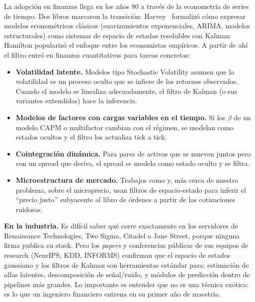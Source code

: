 \documentclass[journal,onecolumn,11pt]{IEEEtran}
\begin{document}
\medskip

\noindent
La adopción en finanzas llega en los años 80 a través de la
econometría de series de tiempo. Dos libros marcaron la transición:
Harvey~\cite{harvey1989} formalizó cómo expresar modelos econométricos
clásicos (suavizamientos exponenciales, ARIMA, modelos estructurales)
como sistemas de espacio de estados resolubles con Kalman; Hamilton
\cite{hamilton1994} popularizó el enfoque entre los economistas
empíricos. A partir de ahí el filtro entró en finanzas cuantitativas
para tareas concretas:
\begin{itemize}
\item \textbf{Volatilidad latente.} Modelos tipo Stochastic Volatility
      asumen que la volatilidad es un proceso oculto que se infiere
      de los retornos observados. Cuando el modelo se linealiza
      adecuadamente, el filtro de Kalman (o sus variantes extendidas)
      hace la inferencia.
\item \textbf{Modelos de factores con cargas variables en el tiempo.}
      Si los $\beta$ de un modelo CAPM o multifactor cambian con el
      régimen, se modelan como estados ocultos y el filtro los
      actualiza tick a tick.
\item \textbf{Cointegración dinámica.} Para pares de activos que se
      mueven juntos pero con un spread que deriva, el spread se
      modela como estado oculto y se filtra.
\item \textbf{Microestructura de mercado.} Trabajos como
      \cite{cont2014} y, más cerca de nuestro problema,
      \cite{stoikov2018} sobre el microprecio, usan filtros de
      espacio-estado para inferir el ``precio justo'' subyacente al
      libro de órdenes a partir de las cotizaciones ruidosas.
\end{itemize}

\medskip

\noindent
\textbf{En la industria.} Es difícil saber qué corre exactamente en
los servidores de Renaissance Technologies, Two Sigma, Citadel o
Jane Street, porque ninguna firma publica su stack. Pero los
\emph{papers} y conferencias públicas de sus equipos de research
(NeurIPS, KDD, INFORMS) confirman que el espacio de estados
gaussiano y los filtros de Kalman son herramientas estándar para:
estimación de alfas latentes, descomposición de señal/ruido, y
módulos de predicción dentro de pipelines más grandes. Lo importante
es entender que no es una técnica exótica: es lo que un ingeniero
financiero entrena en su primer año de maestría.
\end{document}
